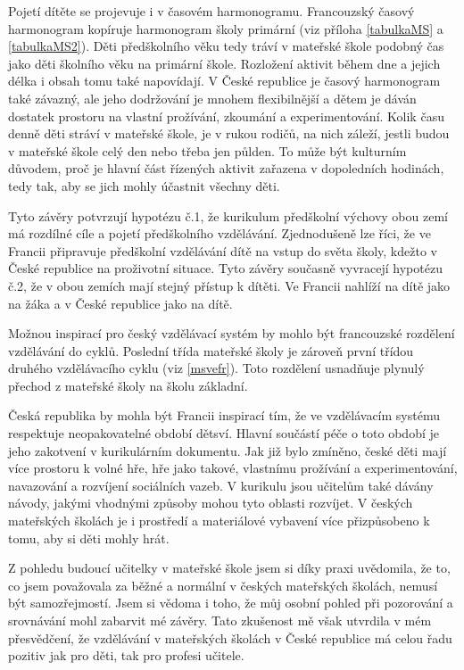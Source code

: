Pojetí dítěte se projevuje i v časovém harmonogramu. Francouzský časový harmonogram kopíruje harmonogram školy primární (viz příloha \ref{tabulkaMS} a \ref{tabulkaMS2}). Děti předškolního věku tedy tráví v mateřské škole podobný čas jako děti školního věku na primární škole. Rozložení aktivit během dne a jejich délka i obsah tomu také napovídají. V České republice je časový harmonogram také závazný, ale jeho dodržování je mnohem flexibilnější a dětem je dáván dostatek prostoru na vlastní prožívání, zkoumání a experimentování. Kolik času denně  děti stráví v mateřské škole, je v rukou rodičů, na nich záleží, jestli budou v mateřské škole celý den nebo třeba jen půlden. To může být kulturním důvodem, proč je hlavní část řízených aktivit zařazena v dopoledních hodinách, tedy tak, aby se jich mohly účastnit všechny děti. 

Tyto závěry potvrzují hypotézu č.1, že kurikulum předškolní výchovy obou zemí má rozdílné cíle a pojetí předškolního vzdělávání. Zjednodušeně lze říci, že ve Francii připravuje předškolní vzdělávání dítě na vstup do světa školy, kdežto v České republice na proživotní situace. Tyto závěry současně vyvracejí hypotézu č.2, že v obou zemích mají stejný přístup k dítěti. Ve Francii nahlíží na dítě jako na žáka a v České republice jako na dítě. 

Možnou inspirací pro český vzdělávací systém by mohlo být francouzské rozdělení vzdělávání do cyklů. Poslední třída mateřské školy je zároveň první třídou druhého vzdělávacího cyklu (viz \ref{msvefr}). Toto rozdělení usnadňuje plynulý přechod z mateřské školy na školu základní. 

Česká republika by mohla být Francii inspirací tím, že ve vzdělávacím systému respektuje neopakovatelné období dětsví. Hlavní součástí péče o toto období je jeho zakotvení v kurikulárním dokumentu. Jak již bylo zmíněno, české děti mají více prostoru k volné hře, hře jako takové, vlastnímu prožívání a experimentování, navazování a rozvíjení sociálních vazeb. V kurikulu jsou učitelům také dávány návody, jakými vhodnými způsoby mohou tyto oblasti rozvíjet. V českých mateřských školách je i prostředí a materiálové vybavení více přizpůsobeno k tomu, aby si děti mohly hrát.

Z pohledu budoucí učitelky v mateřské škole jsem si díky praxi uvědomila, že to, co jsem považovala za běžné a normální v českých mateřských školách, nemusí být samozřejmostí. Jsem si vědoma i toho, že můj osobní pohled při pozorování a srovnávání mohl zabarvit mé závěry. Tato zkušenost mě však utvrdila v mém přesvědčení, že vzdělávání v mateřských školách v České republice má celou řadu pozitiv jak pro děti, tak pro profesi učitele. 